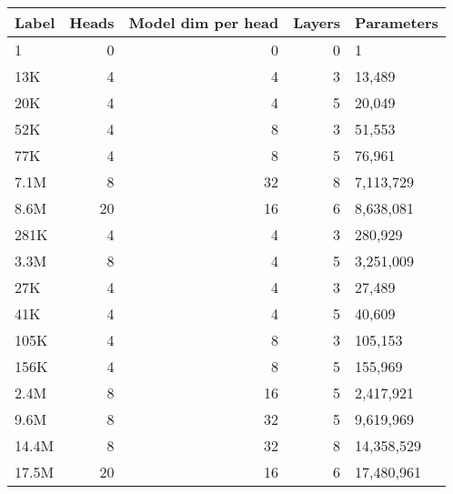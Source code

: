 \begin{tabular}{lrrrl}
\toprule
Label & Heads & Model dim per head & Layers & Parameters \\
\midrule
1 & 0 & 0 & 0 & 1 \\
13K & 4 & 4 & 3 & 13,489 \\
20K & 4 & 4 & 5 & 20,049 \\
52K & 4 & 8 & 3 & 51,553 \\
77K & 4 & 8 & 5 & 76,961 \\
7.1M & 8 & 32 & 8 & 7,113,729 \\
8.6M & 20 & 16 & 6 & 8,638,081 \\
281K & 4 & 4 & 3 & 280,929 \\
3.3M & 8 & 4 & 5 & 3,251,009 \\
27K & 4 & 4 & 3 & 27,489 \\
41K & 4 & 4 & 5 & 40,609 \\
105K & 4 & 8 & 3 & 105,153 \\
156K & 4 & 8 & 5 & 155,969 \\
2.4M & 8 & 16 & 5 & 2,417,921 \\
9.6M & 8 & 32 & 5 & 9,619,969 \\
14.4M & 8 & 32 & 8 & 14,358,529 \\
17.5M & 20 & 16 & 6 & 17,480,961 \\
\bottomrule
\end{tabular}
